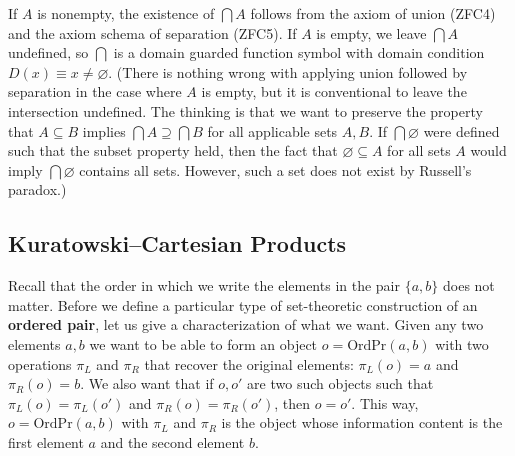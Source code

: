 \noindent If $A$ is nonempty, the existence of $\bigcap A$ follows from the axiom of union (ZFC4) and the axiom schema of separation (ZFC5). 
If $A$ is empty, we leave $\bigcap A$ undefined, so $\bigcap$ is a domain guarded function symbol with domain condition $D(x)\equiv x\ne\varnothing$. 
(There is nothing wrong with applying union followed by separation in the case where $A$ is empty, but it is conventional to leave the intersection undefined.
The thinking is that we want to preserve the property that $A\subseteq B$ implies $\bigcap A\supseteq\bigcap B$ for all applicable sets $A, B$.
If $\bigcap\varnothing$ were defined such that the subset property held, then the fact that $\varnothing\subseteq A$ for all sets $A$ would imply $\bigcap\varnothing$ contains all sets.
However, such a set does not exist by Russell's paradox.)

\subsection{Kuratowski--Cartesian Products}

Recall that the order in which we write the elements in the pair $\{a, b\}$ does not matter. 
Before we define a particular type of set-theoretic construction of an \textbf{ordered pair}, let us give a characterization of what we want. 
Given any two elements $a, b$ we want to be able to form an object $o = \textrm{OrdPr}(a, b)$ with two operations $\pi_{L}$ and $\pi_{R}$ that recover the original elements: $\pi_{L}(o) = a$ and $\pi_{R}(o) = b$. 
We also want that if $o, o'$ are two such objects such that $\pi_{L}(o) = \pi_{L}(o')$ and $\pi_{R}(o) = \pi_{R}(o')$, then $o = o'$. 
This way, $o = \textrm{OrdPr}(a, b)$ with $\pi_{L}$ and $\pi_{R}$ is the object whose information content is the first element $a$ and the second element $b$. 

